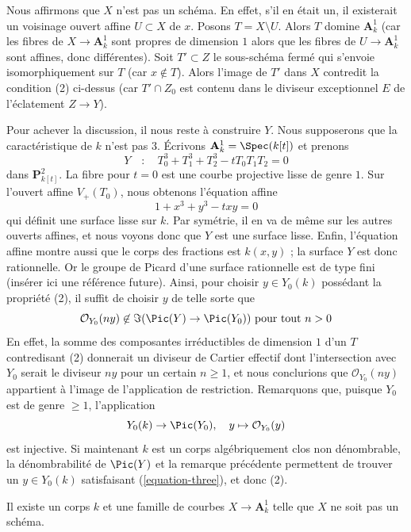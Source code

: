 \medskip\noindent
Nous affirmons que $X$ n'est pas un schéma. En effet, s'il en était un,
il existerait un voisinage ouvert affine $U \subset X$ de $x$.
Posons $T = X \setminus U$. Alors $T$ domine $\mathbf{A}^1_k$
(car les fibres de $X \to \mathbf{A}^1_k$ sont propres de dimension $1$
alors que les fibres de $U \to \mathbf{A}^1_k$ sont affines, donc différentes).
Soit $T' \subset Z$ le sous-schéma fermé qui s'envoie isomorphiquement
sur $T$ (car $x \not \in T$). Alors l'image de $T'$ dans $X$
contredit la condition (2) ci-dessus (car $T' \cap Z_0$ est contenu dans
le diviseur exceptionnel $E$ de l'éclatement $Z \to Y$).

\medskip\noindent
Pour achever la discussion, il nous reste à construire $Y$.
Nous supposerons que la caractéristique de $k$ n'est pas $3$.
Écrivons $\mathbf{A}^1_k = \Spec(k[t])$ et prenons
$$
Y \quad : \quad T_0^3 + T_1^3 + T_2^3 - tT_0T_1T_2 = 0
$$
dans $\mathbf{P}^2_{k[t]}$. La fibre pour $t = 0$
est une courbe projective lisse de genre $1$. Sur l'ouvert affine
$V_+(T_0)$, nous obtenons l'équation affine
$$
1 + x^3 + y^3 - txy = 0
$$
qui définit une surface lisse sur $k$. Par symétrie, il en va de même sur les
autres ouverts affines, et nous voyons donc que $Y$ est une surface lisse.
Enfin, l'équation affine montre aussi que le corps des fractions
est $k(x, y)$ ; la surface $Y$ est donc rationnelle.
Or le groupe de Picard d'une surface rationnelle est de type fini
(insérer ici une référence future).
Ainsi, pour choisir $y \in Y_0(k)$ possédant la propriété (2),
il suffit de choisir $y$ de telle sorte que
\begin{equation}
\label{equation-three}
\mathcal{O}_{Y_0}(ny) \not \in \Im(\Pic(Y) \to \Pic(Y_0))
\text{ pour tout }n > 0
\end{equation}
En effet, la somme des composantes irréductibles de dimension $1$ d'un $T$
contredisant (2) donnerait un diviseur de Cartier effectif dont l'intersection avec $Y_0$
serait le diviseur $ny$ pour un certain $n \geq 1$, et nous conclurions
que $\mathcal{O}_{Y_0}(ny)$ appartient à l'image de l'application de restriction.
Remarquons que, puisque $Y_0$ est de genre $\geq 1$, l'application
$$
Y_0(k) \to \Pic(Y_0),\quad y \mapsto \mathcal{O}_{Y_0}(y)
$$
est injective. Si maintenant $k$ est un corps algébriquement clos non dénombrable,
la dénombrabilité de $\Pic(Y)$ et la remarque
précédente permettent de trouver un $y \in Y_0(k)$ satisfaisant (\ref{equation-three}),
et donc (2).

\begin{lemma}
\label{lemma-family-of-curves-not-scheme}
Il existe un corps $k$ et une famille de courbes
$X \to \mathbf{A}^1_k$ telle que $X$ ne soit pas un schéma.
\end{lemma}

